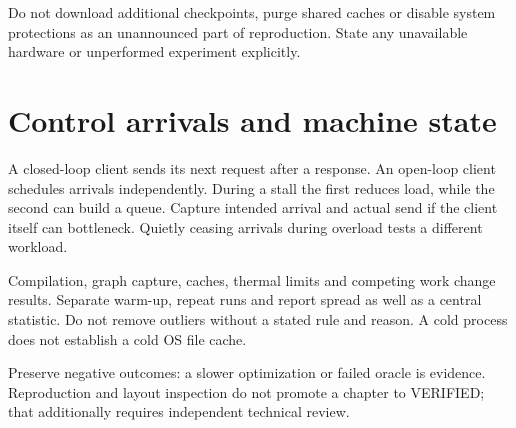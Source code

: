 Do not download additional checkpoints, purge shared caches or disable
system protections as an unannounced part of reproduction. State any
unavailable hardware or unperformed experiment explicitly.

\section{Control arrivals and machine state}
A closed-loop client sends its next request after a response. An open-loop
client schedules arrivals independently. During a stall the first reduces
load, while the second can build a queue. Capture intended arrival and
actual send if the client itself can bottleneck. Quietly ceasing arrivals
during overload tests a different workload.

Compilation, graph capture, caches, thermal limits and competing work
change results. Separate warm-up, repeat runs and report spread as well
as a central statistic. Do not remove outliers without a stated rule and
reason. A cold process does not establish a cold OS file cache.

Preserve negative outcomes: a slower optimization or failed oracle is
evidence. Reproduction and layout inspection do not promote a chapter to
VERIFIED; that additionally requires independent technical review.
